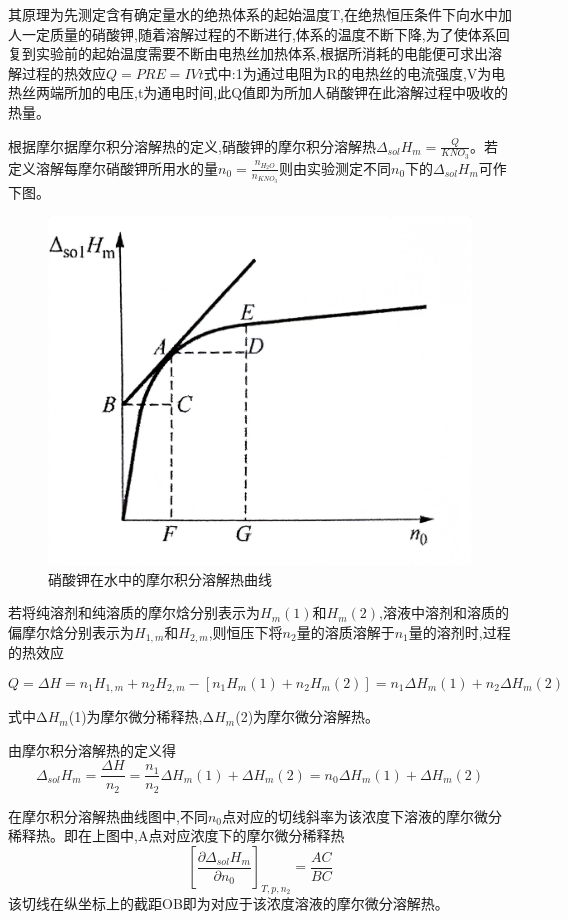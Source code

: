 \documentclass[UTF8]{ctexart}
\begin{document}
其原理为先测定含有确定量水的绝热体系的起始温度T,在绝热恒压条件下向水中加人一定质量的硝酸钾,随着溶解过程的不断进行,体系的温度不断下降,为了使体系回复到实验前的起始温度需要不断由电热丝加热体系,根据所消耗的电能便可求出溶解过程的热效应$Q=PRE=IVt$式中:1为通过电阻为R的电热丝的电流强度,V为电热丝两端所加的电压,t为通电时间,此Q值即为所加人硝酸钾在此溶解过程中吸收的热量。

根据摩尔据摩尔积分溶解热的定义,硝酸钾的摩尔积分溶解热$\Delta_{sol}H_m=\frac{Q}{KNO_3}$。若定义溶解每摩尔硝酸钾所用水的量$n_0=\frac{n_{H_2O}}{n_{KNO_3}}$则由实验测定不同$n_0$下的$\Delta_{sol}H_m$可作下图。

\begin{figure}[H]
  \centering
  \includegraphics[scale = 0.1]{fig1.JPG} %
  \caption{硝酸钾在水中的摩尔积分溶解热曲线}
  \label{fig:example}
\end{figure}

若将纯溶剂和纯溶质的摩尔焓分别表示为$H_m(1)$和$H_m(2)$,溶液中溶剂和溶质的偏摩尔焓分别表示为$H_{1,m}$和$H_{2,m}$,则恒压下将$n_2$量的溶质溶解于$n_1$量的溶剂时,过程的热效应

\[Q=\Delta H=n_1H_{1,m}+n_2H_{2,m}-[n_1H_m(1)+n_2H_m(2)]=n_1\Delta H_m(1)+n_2\Delta H_m(2)\]

式中Δ$H_m$(1)为摩尔微分稀释热,Δ$H_m$(2)为摩尔微分溶解热。

由摩尔积分溶解热的定义得
\[\Delta_{sol}H_m=\frac{\Delta H}{n_2}=\frac{n_1}{n_2}\Delta H_m(1)+\Delta H_m(2)=n_0\Delta H_m(1)+\Delta H_m(2)\]

在摩尔积分溶解热曲线图中,不同$n_0$点对应的切线斜率为该浓度下溶液的摩尔微分稀释热。即在上图中,A点对应浓度下的摩尔微分稀释热\[\left[ \frac{ \partial\Delta_{sol}H_m}{\partial n_0}\right] _{T,p,n_2} = \frac{AC}{BC}\]该切线在纵坐标上的截距OB即为对应于该浓度溶液的摩尔微分溶解热。
\end{document}
